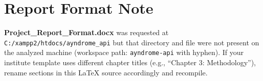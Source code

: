 \documentclass[12pt,a4paper,oneside]{report}
\begin{document}
\chapter{Report Format Note}
\textbf{Project\_Report\_Format.docx} was requested at
\texttt{C:/xampp2/htdocs/ayndrome\_api} but that directory and file were not present on the
analyzed machine (workspace path: \texttt{ayndrome-api} with hyphen). If your institute template
uses different chapter titles (e.g., ``Chapter 3: Methodology''), rename sections in this
\LaTeX{} source accordingly and recompile.
\end{document}
